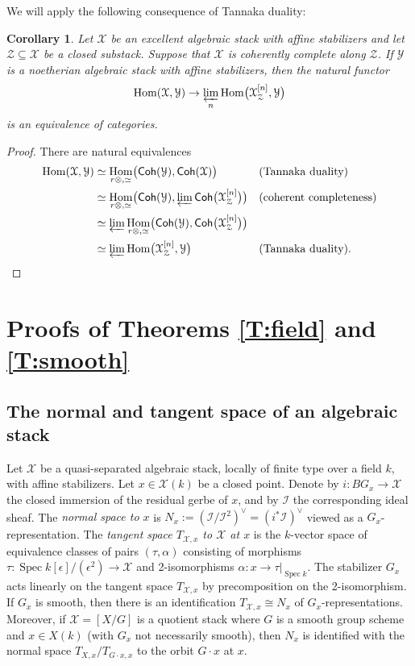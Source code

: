\documentclass[a4paper]{amsart}
\theoremstyle{plain}
\newtheorem{corollary}[theorem]{Corollary}
\theoremstyle{definition}
\theoremstyle{remark}
\numberwithin{equation}{section}
\newcommand\cI{\mathcal{I}}
\newcommand\cX{\mathcal{X}}
\newcommand\cY{\mathcal{Y}}
\newcommand\cZ{\mathcal{Z}}
\newcommand\co{\colon}
\newcommand\Coh{\mathsf{Coh}}
\DeclareMathOperator{\Spec}{Spec}
\newcommand{\ilim}{\varprojlim}
\DeclareMathOperator{\Hom}{Hom}
\begin{document}
We will apply the following consequence of Tannaka duality:

\begin{corollary} \label{C:tannakian}
Let $\cX$ be an excellent algebraic stack with affine stabilizers and let $\cZ \subseteq \cX$ be a closed substack.  Suppose that $\cX$ is coherently complete along $\cZ$. 
If $\cY$ is a noetherian algebraic stack with affine stabilizers, then the natural functor
$$\Hom(\cX, \cY) \to \ilim_n \Hom\bigl(\cX_{\cZ}^{[n]}, \cY\bigr)$$
is an equivalence of categories.
\end{corollary}

\begin{proof}
There are natural equivalences
\begin{align*}
\Hom(\cX, \cY) 	& \simeq \Hom_{r\otimes, \simeq}\bigl( \Coh(\cY), \Coh(\cX)\bigr)  & & \text{(Tannaka duality)}\\
				& \simeq \Hom_{r\otimes, \simeq}\bigl( \Coh(\cY), \ilim \Coh\bigl(\cX_{\cZ}^{[n]}\bigr) \bigr)  & & \text{(coherent completeness)}\\
				& \simeq \ilim \Hom_{r\otimes, \simeq}\bigl( \Coh(\cY), \Coh\bigl(\cX_{\cZ}^{[n]}\bigr) \bigr)  & & \\
				& \simeq \ilim \Hom\bigl(\cX_{\cZ}^{[n]}, \cY\bigr) & & \text{(Tannaka duality)}.\qedhere
\end{align*}
\end{proof}


 \section{Proofs of Theorems \ref{T:field} and \ref{T:smooth}} \label{S:proof-section}
 
 \subsection{The normal and tangent space of an algebraic stack} \label{S:tangent}
Let $\cX$ be a quasi-separated algebraic stack, locally of finite type over a field $k$, with affine stabilizers. Let $x \in \cX(k)$ be a closed point.  Denote by $i \co BG_x \to \cX$ the closed immersion of the residual gerbe of $x$, and by $\cI$ the corresponding ideal sheaf.  The {\it normal space to $x$} is $N_x := (\cI/\cI^2)^{\vee} = (i^* \cI)^{\vee}$ viewed as a $G_x$-representation. The {\it tangent space $T_{\cX,x}$ to $\cX$ at $x$} is the $k$-vector space of equivalence classes of pairs $(\tau, \alpha)$ consisting of morphisms $\tau \co \Spec k[\epsilon]/(\epsilon^2) \to \cX$ and 2-isomorphisms $\alpha \co x \to \tau|_{\Spec k}$.  The stabilizer $G_x$ acts linearly on the tangent space $T_{\cX,x}$ by precomposition on the 2-isomorphism.  
If $G_x$ is smooth, then there is an identification $T_{\cX,x} \cong N_x$ of $G_x$-representations.  Moreover, if $\cX = [X/G]$ is a quotient stack where $G$ is a smooth group scheme and $x \in X(k)$ (with $G_x$  not necessarily smooth), then $N_x$ is identified with the normal space  $T_{X,x} / T_{G \cdot x, x}$ to the orbit $G \cdot x$ at $x$.
\end{document}
